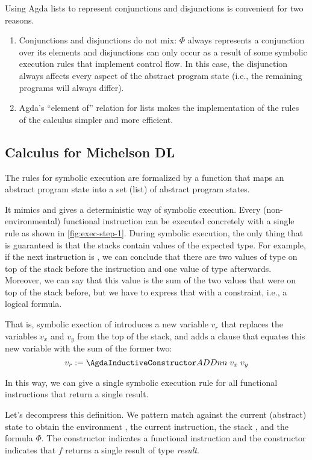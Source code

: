 Using Agda lists to represent conjunctions and disjunctions is
convenient for two reasons.
\begin{enumerate}
\item Conjunctions and disjunctions do not mix: $\Phi$ always represents a conjunction over its elements
  and disjunctions can only occur as a result of some
  symbolic execution rules that implement control flow. 
  In this case, the disjunction always affects every aspect of the abstract program state
  (i.e., the remaining programs will always differ).
\item Agda's ``element of'' relation for lists makes the
  implementation of the rules of the calculus simpler and more efficient.
\end{enumerate}

\subsection{Calculus for Michelson DL}\label{sec:calculus}

The rules for symbolic execution are formalized by a function that
maps an abstract program state into a set (list) of abstract program states.
\AbstractProgStep

It mimics  and gives a deterministic way of symbolic execution.
Every (non-environmental) functional instruction can be executed concretely
with a single rule as shown in \autoref{fig:exec-step-1}.
During symbolic execution, the only thing that is guaranteed is
that the stacks contain values of the expected type.
For example, if the next instruction is , we can conclude
that there are two values of type  on top of the stack
before the instruction and one value of type 
afterwards. Moreover, we can say that this value is the sum of the two
values that were on top of the stack before, but we have to express
that with a constraint, i.e., a logical formula.

That is, symbolic exection of  introduces a new variable $v_r$ that replaces the
variables $v_x$ and  $v_y$ from the top of the stack,
and adds a clause that equates this new variable with the sum of the former two:
\[	v_r := \ACon{ADDnn}\; v_x\; v_y
\]

In this way, we can give a single symbolic execution rule for all
functional instructions that return a single result.
\AbstractProgStepDOne

Let's decompress this definition. We pattern match against the current
(abstract) state to obtain the environment {\Aaen}, the current
instruction, the stack {\Aast}, and the formula $\Phi$. The
constructor  indicates a functional instruction and the
constructor  indicates that $f$ returns a single result of
type \emph{result}.

